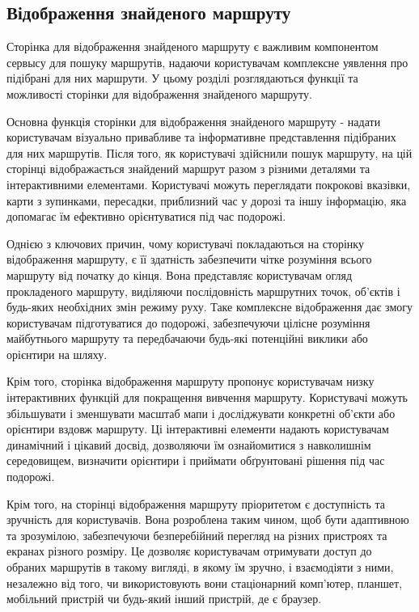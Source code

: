 \subsection{Відображення знайденого маршруту}
\label{subsec:route-displaying-subsection}

Сторінка для відображення знайденого маршруту є важливим компонентом сервысу для пошуку маршрутів, надаючи користувачам комплексне уявлення про підібрані для них маршрути. У цьому розділі розглядаються функції та можливості сторінки для відображення знайденого маршруту.

Основна функція сторінки для відображення знайденого маршруту - надати користувачам візуально привабливе та інформативне представлення підібраних для них маршрутів. Після того, як користувачі здійснили пошук маршруту, на цій сторінці відображається знайдений маршрут разом з різними деталями та інтерактивними елементами. Користувачі можуть переглядати покрокові вказівки, карти з зупинками, пересадки, приблизний час у дорозі та іншу інформацію, яка допомагає їм ефективно орієнтуватися під час подорожі.

Однією з ключових причин, чому користувачі покладаються на сторінку відображення маршруту, є її здатність забезпечити чітке розуміння всього маршруту від початку до кінця. Вона представляє користувачам огляд прокладеного маршруту, виділяючи послідовність маршрутних точок, об'єктів і будь-яких необхідних змін режиму руху. Таке комплексне відображення дає змогу користувачам підготуватися до подорожі, забезпечуючи цілісне розуміння майбутнього маршруту та передбачаючи будь-які потенційні виклики або орієнтири на шляху.

Крім того, сторінка відображення маршруту пропонує користувачам низку інтерактивних функцій для покращення вивчення маршруту. Користувачі можуть збільшувати і зменшувати масштаб мапи і досліджувати конкретні об'єкти або орієнтири вздовж маршруту. Ці інтерактивні елементи надають користувачам динамічний і цікавий досвід, дозволяючи їм ознайомитися з навколишнім середовищем, визначити орієнтири і приймати обґрунтовані рішення під час подорожі.

Крім того, на сторінці відображення маршруту пріоритетом є доступність та зручність для користувачів. Вона розроблена таким чином, щоб бути адаптивною та зрозумілою, забезпечуючи безперебійний перегляд на різних пристроях та екранах різного розміру. Це дозволяє користувачам отримувати доступ до обраних маршрутів в такому вигляді, в якому їм зручно, і взаємодіяти з ними, незалежно від того, чи використовують вони стаціонарний комп'ютер, планшет, мобільний пристрій чи будь-який інший пристрій, де є браузер.

